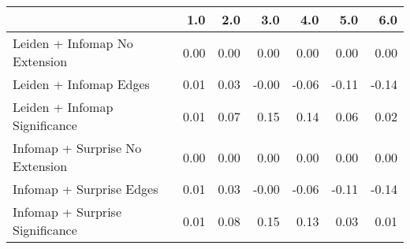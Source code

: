 \begin{tabular}{lrrrrrr}
\toprule
{} &  1.0 &  2.0 &   3.0 &   4.0 &   5.0 &   6.0 \\
\midrule
Leiden + Infomap No Extension   & 0.00 & 0.00 &  0.00 &  0.00 &  0.00 &  0.00 \\
Leiden + Infomap Edges          & 0.01 & 0.03 & -0.00 & -0.06 & -0.11 & -0.14 \\
Leiden + Infomap Significance   & 0.01 & 0.07 &  0.15 &  0.14 &  0.06 &  0.02 \\
Infomap + Surprise No Extension & 0.00 & 0.00 &  0.00 &  0.00 &  0.00 &  0.00 \\
Infomap + Surprise Edges        & 0.01 & 0.03 & -0.00 & -0.06 & -0.11 & -0.14 \\
Infomap + Surprise Significance & 0.01 & 0.08 &  0.15 &  0.13 &  0.03 &  0.01 \\
\bottomrule
\end{tabular}
